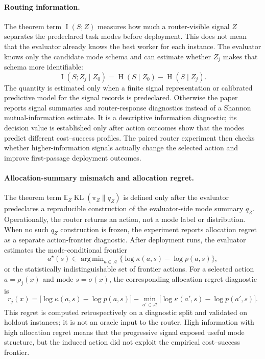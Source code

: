 \documentclass{article}
\DeclareMathOperator*{\argmin}{arg\,min}
\DeclareMathOperator{\KL}{KL}
\DeclareMathOperator{\MI}{I}
\DeclareMathOperator{\Hent}{H}
\newcommand{\cA}{\mathcal{A}}
\newcommand{\E}{\mathbb{E}}
\begin{document}
\paragraph{Routing information.}
The theorem term $\MI(S;Z)$ measures how much a router-visible signal $Z$ separates the predeclared task modes before deployment.
This does not mean that the evaluator already knows the best worker for each instance.
The evaluator knows only the candidate mode schema and can estimate whether $Z_j$ makes that schema more identifiable:
\[
\MI(S;Z_j\mid Z_0)=\Hent(S\mid Z_0)-\Hent(S\mid Z_j).
\]
The quantity is estimated only when a finite signal representation or calibrated predictive model for the signal records is predeclared.
Otherwise the paper reports signal summaries and router-response diagnostics instead of a Shannon mutual-information estimate.
It is a descriptive information diagnostic; its decision value is established only after action outcomes show that the modes predict different cost--success profiles.
The paired router experiment then checks whether higher-information signals actually change the selected action and improve first-passage deployment outcomes.

\paragraph{Allocation-summary mismatch and allocation regret.}
The theorem term $\E_Z\KL(\pi_Z\|q_Z)$ is defined only after the evaluator predeclares a reproducible construction of the evaluator-side mode summary $q_Z$.
Operationally, the router returns an action, not a mode label or distribution.
When no such $q_Z$ construction is frozen, the experiment reports allocation regret as a separate action-frontier diagnostic.
After deployment runs, the evaluator estimates the mode-conditional frontier
\[
a^\star(s)\in\argmin_{a\in\cA}\{\log\kappa(a,s)-\log p(a,s)\},
\]
or the statistically indistinguishable set of frontier actions.
For a selected action $a=\rho_j(x)$ and mode $s=\sigma(x)$, the corresponding allocation regret diagnostic is
\[
r_j(x)
=
\bigl[\log\kappa(a,s)-\log p(a,s)\bigr]
-
\min_{a'\in\cA}\bigl[\log\kappa(a',s)-\log p(a',s)\bigr].
\]
This regret is computed retrospectively on a diagnostic split and validated on holdout instances; it is not an oracle input to the router.
High information with high allocation regret means that the progressive signal exposed useful mode structure, but the induced action did not exploit the empirical cost--success frontier.
\end{document}
